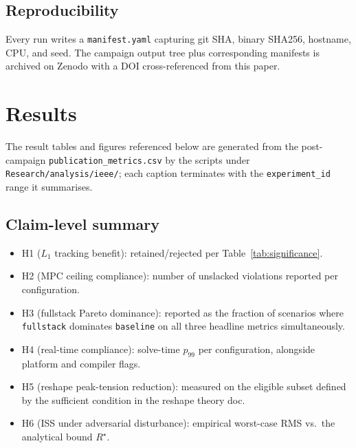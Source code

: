 \documentclass[journal,twocolumn,10pt]{IEEEtran}
\begin{document}
\subsection{Reproducibility}
Every run writes a \texttt{manifest.yaml} capturing git SHA, binary
SHA256, hostname, CPU, and seed. The campaign output tree plus
corresponding manifests is archived on Zenodo with a DOI
cross-referenced from this paper.

\section{Results}
\label{sec:results}

The result tables and figures referenced below are generated from
the post-campaign \texttt{publication\_metrics.csv} by the scripts
under \texttt{Research/analysis/ieee/}; each caption terminates with
the \texttt{experiment\_id} range it summarises.





\subsection{Claim-level summary}

\begin{itemize}
\item H1 ($L_1$ tracking benefit): retained/rejected per
      Table~\ref{tab:significance}.
\item H2 (MPC ceiling compliance): number of unslacked violations
      reported per configuration.
\item H3 (fullstack Pareto dominance): reported as the fraction of
      scenarios where \texttt{fullstack} dominates \texttt{baseline}
      on all three headline metrics simultaneously.
\item H4 (real-time compliance): solve-time $p_{99}$ per
      configuration, alongside platform and compiler flags.
\item H5 (reshape peak-tension reduction): measured on the eligible
      subset defined by the sufficient condition in the reshape
      theory doc.
\item H6 (ISS under adversarial disturbance): empirical worst-case
      RMS vs.\ the analytical bound $R^\star$.
\end{itemize}
\end{document}
